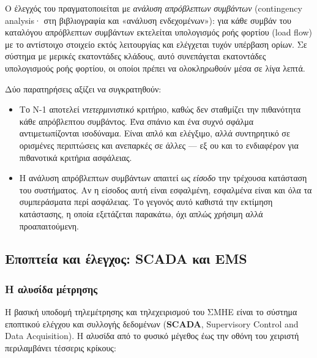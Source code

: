 Ο έλεγχός του πραγματοποιείται με \emph{ανάλυση απρόβλεπτων συμβάντων} (contingency
analysis· στη βιβλιογραφία και «ανάλυση ενδεχομένων»): για κάθε συμβάν του καταλόγου
απρόβλεπτων συμβάντων εκτελείται υπολογισμός ροής φορτίου (load flow) με το αντίστοιχο
στοιχείο εκτός λειτουργίας και ελέγχεται τυχόν υπέρβαση ορίων. Σε σύστημα με μερικές
εκατοντάδες κλάδους, αυτό συνεπάγεται εκατοντάδες υπολογισμούς ροής φορτίου, οι οποίοι
πρέπει να ολοκληρωθούν μέσα σε λίγα λεπτά.

Δύο παρατηρήσεις αξίζει να συγκρατηθούν:

\begin{itemize}
\item Το N-1 αποτελεί \emph{ντετερμινιστικό} κριτήριο, καθώς δεν σταθμίζει την πιθανότητα
      κάθε απρόβλεπτου συμβάντος. Ένα σπάνιο και ένα συχνό σφάλμα αντιμετωπίζονται ισοδύναμα. Είναι
      απλό και ελέγξιμο, αλλά συντηρητικό σε ορισμένες περιπτώσεις και ανεπαρκές σε άλλες —
      εξ ου και το ενδιαφέρον για πιθανοτικά κριτήρια ασφάλειας.
\item Η ανάλυση απρόβλεπτων συμβάντων απαιτεί ως \emph{είσοδο} την τρέχουσα κατάσταση του συστήματος.
      Αν η είσοδος αυτή είναι εσφαλμένη, εσφαλμένα είναι και όλα τα συμπεράσματα περί
      ασφάλειας. Το γεγονός αυτό καθιστά την εκτίμηση κατάστασης, η οποία εξετάζεται
      παρακάτω, όχι απλώς χρήσιμη αλλά προαπαιτούμενη.
\end{itemize}

\subsection{Εποπτεία και έλεγχος: SCADA και EMS}

\subsubsection*{Η αλυσίδα μέτρησης}

Η βασική υποδομή τηλεμέτρησης και τηλεχειρισμού του ΣΜΗΕ είναι το σύστημα εποπτικού
ελέγχου και συλλογής δεδομένων (\textbf{SCADA}, Supervisory Control and Data Acquisition). Η αλυσίδα από το φυσικό μέγεθος έως την οθόνη
του χειριστή περιλαμβάνει τέσσερις κρίκους:

